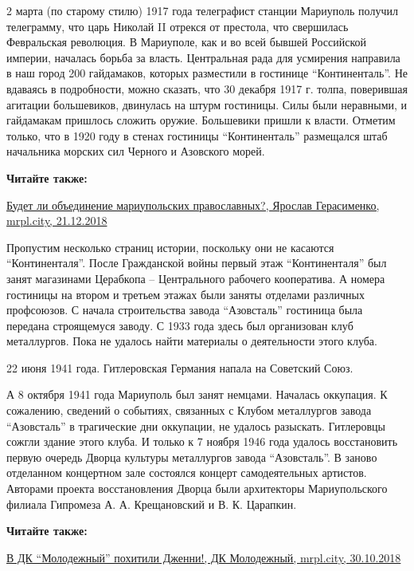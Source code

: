 2 марта (по старому стилю) 1917 года телеграфист станции Мариуполь получил
телеграмму, что царь Николай II отрекся от престола, что свершилась Февральская
революция. В Мариуполе, как и во всей бывшей Российской империи, началась
борьба за власть. Центральная рада для усмирения направила в наш город 200
гайдамаков, которых разместили в гостинице \enquote{Континенталь}. Не вдаваясь в
подробности, можно сказать, что 30 декабря 1917 г. толпа, поверившая агитации
большевиков, двинулась на штурм гостиницы. Силы были неравными, и гайдамакам
пришлось сложить оружие. Большевики пришли к власти. Отметим только, что в 1920
году в стенах гостиницы \enquote{Континенталь} размещался штаб начальника морских сил
Черного и Азовского морей.

\textbf{Читайте также:} 

\href{https://mrpl.city/news/view/budet-li-obedinenie-mariupolskih-pravoslavnyh-foto}{%
Будет ли объединение мариупольских православных?, Ярослав Герасименко, mrpl.city, 21.12.2018}


Пропустим несколько страниц истории, поскольку они не касаются \enquote{Континенталя}.
После Гражданской войны первый этаж \enquote{Континенталя} был занят магазинами
Церабкопа – Центрального рабочего кооператива. А номера гостиницы на втором и
третьем этажах были заняты отделами различных профсоюзов. С начала
строительства завода \enquote{Азовсталь} гостиница была передана строящемуся заводу. С
1933 года здесь был организован клуб металлургов. Пока не удалось найти
материалы о деятельности этого клуба.

22 июня 1941 года. Гитлеровская Германия напала на Советский Союз.

А 8 октября 1941 года Мариуполь был занят немцами. Началась оккупация. К
сожалению, сведений о событиях, связанных с Клубом металлургов завода
\enquote{Азовсталь} в трагические дни оккупации, не удалось разыскать. Гитлеровцы
сожгли здание этого клуба. И только к 7 ноября 1946 года удалось восстановить
первую очередь Дворца культуры металлургов завода \enquote{Азовсталь}. В заново
отделанном концертном зале состоялся концерт самодеятельных артистов. Авторами
проекта восстановления Дворца были архитекторы Мариупольского филиала Гипромеза
А. А. Крещановский и В. К. Царапкин.

\textbf{Читайте также:} 

\href{https://mrpl.city/blogs/view/v-dk-molodezhnyj-pohitili-dzhenni}{%
В ДК \enquote{Молодежный} похитили Дженни!, ДК Молодежный, mrpl.city, 30.10.2018}


